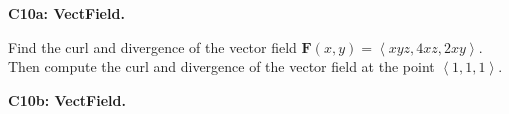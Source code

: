 \documentclass[12pt]{article}
\newcommand{\vect}{\mathbf}
\newcommand{\<}{\left\langle}
\renewcommand{\>}{\right\rangle}
\newcommand{\veci}{\hat{\imath}}
\newcommand{\vecj}{\hat{\jmath}}
\newcommand{\veck}{\hat{k}}
\newcommand{\exerciseHeader}[4]{


  \vspace{0.5em}
  \textbf{#2}
  \vspace{0.5em}

}
\begin{document}
\begin{multicols}{2}
%

%



%

%

%

%


\exerciseHeader{2017 July 17}{C10a: VectField.}{
Analyze vector fields, including computing curl and divergence.
}{2/4}

Find the curl and divergence of the vector field
\(\vect F(x,y)=\<xyz,4xz,2xy\>\). Then compute the curl and divergence
of the vector field at the point \(\<1,1,1\>\).

\exerciseHeader{2017 July 17}{C10b: VectField.}{
Analyze vector fields, including computing curl and divergence.
}{2/4}


\end{multicols}
\end{document}
